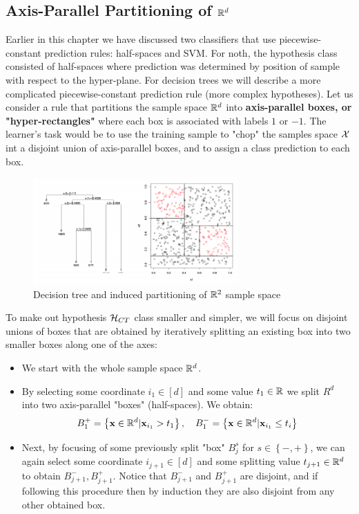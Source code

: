 \subsection{Axis-Parallel Partitioning of $\mathbb{R}^d$}
Earlier in this chapter we have discussed two classifiers that use piecewise-constant prediction rules: half-spaces and SVM. For noth, the hypothesis class consisted of half-spaces where prediction was determined by position of sample with respect to the hyper-plane. For decision trees we will describe a more complicated piecewise-constant prediction rule (more complex hypotheses). Let us consider a rule that partitions the sample space $\mathbb{R}^d$ into \textbf{axis-parallel boxes, or "hyper-rectangles"} where each box is associated with labels $1$ or $-1$. The learner's task would be to use the training sample to "chop" the samples space $\mathcal{X}$ int a disjoint union of axis-parallel boxes, and to assign a class prediction to each box.

\begin{figure}[h!]
	\centering
	\includegraphics[width=0.7\textwidth]{chapters/classification/figures/decision_tree.png}
	\caption{Decision tree and induced partitioning of $\mathbb{R}^2$ sample space}
\end{figure}

To make out hypothesis $\mathcal{H}_{CT}$ class smaller and simpler, we will focus on disjoint unions of boxes that are obtained by iteratively splitting an existing box into two smaller boxes along one of the axes:
\begin{itemize}
	\item We start with the whole sample space $\mathbb{R}^d$.
	\item By selecting some coordinate $i_1\in \left[d\right]$ and some value $t_1\in\mathbb{R}$ we split $R^d$ into two axis-parallel "boxes" (half-spaces). We obtain: $$ B_1^+=\left\{\mathbf{x}\in\mathbb{R}^d|\mathbf{x}_{i_1}>t_1\right\},\quad B_1^{-}=\left\{\mathbf{x}\in\mathbb{R}^d|\mathbf{x}_{i_1}\leq t_i\right\} $$ 
	\item Next, by focusing of some previously split "box" $B_j^s$ for $s\in\left\{-,+\right\}$, we can again select some coordinate $i_{j+1}\in\left[d\right]$ and some splitting value $t_{j+1}\in\mathbb{R}^d$ to obtain $B_{j+1}^{-}, B_{j+1}^{+}$. Notice that $B_{j+1}^{-}$ and $B_{j+1}^{+}$ are disjoint, and if following this procedure then by induction they are also disjoint from any other obtained box.
\end{itemize}

